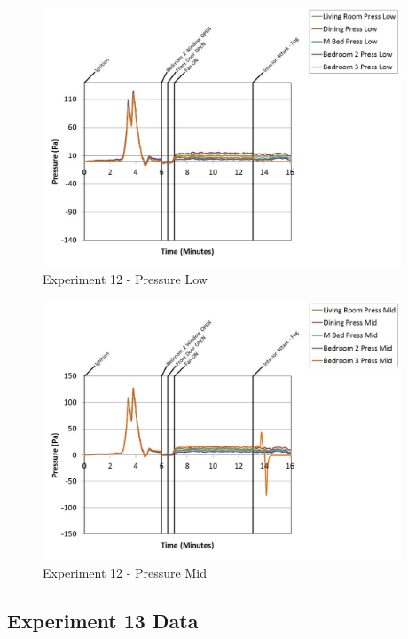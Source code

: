 \documentclass{article}
\begin{document}
\begin{appendices}
	\clearpage

	\begin{figure}[h!]
		\centering
		\includegraphics[height=3.05in]{0_Images/Results_Charts/Exp_12_Charts/PressureLow.pdf}
		\caption{Experiment 12 - Pressure Low}
	\end{figure}
 

	\begin{figure}[h!]
		\centering
		\includegraphics[height=3.05in]{0_Images/Results_Charts/Exp_12_Charts/PressureMid.pdf}
		\caption{Experiment 12 - Pressure Mid}
	\end{figure}
 
	\clearpage

		\clearpage
\clearpage		\large
\subsection{Experiment 13 Data} \label{App:Exp13Results} 


\end{appendices}
\end{document}
